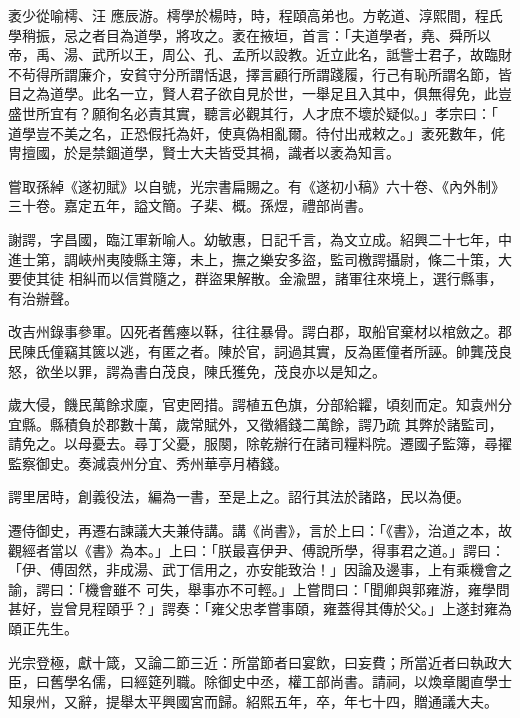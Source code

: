 \begin{pinyinscope}
 袤少從喻樗、汪
 應辰游。樗學於楊時，時，程頤高弟也。方乾道、淳熙間，程氏學稍振，忌之者目為道學，將攻之。袤在掖垣，首言：「夫道學者，堯、舜所以帝，禹、湯、武所以王，周公、孔、孟所以設教。近立此名，詆訾士君子，故臨財不茍得所謂廉介，安貧守分所謂恬退，擇言顧行所謂踐履，行己有恥所謂名節，皆目之為道學。此名一立，賢人君子欲自見於世，一舉足且入其中，俱無得免，此豈盛世所宜有？願徇名必責其實，聽言必觀其行，人才庶不壞於疑似。」孝宗曰：「
 道學豈不美之名，正恐假托為奸，使真偽相亂爾。待付出戒敕之。」袤死數年，侂冑擅國，於是禁錮道學，賢士大夫皆受其禍，識者以袤為知言。



 嘗取孫綽《遂初賦》以自號，光宗書扁賜之。有《遂初小稿》六十卷、《內外制》三十卷。嘉定五年，謚文簡。子棐、概。孫煜，禮部尚書。



 謝諤，字昌國，臨江軍新喻人。幼敏惠，日記千言，為文立成。紹興二十七年，中進士第，調峽州夷陵縣主簿，未上，撫之樂安多盜，監司檄諤攝尉，條二十策，大要使其徒
 相糾而以信賞隨之，群盜果解散。金渝盟，諸軍往來境上，選行縣事，有治辦聲。



 改吉州錄事參軍。囚死者舊瘞以鞂，往往暴骨。諤白郡，取船官棄材以棺斂之。郡民陳氏僮竊其篋以逃，有匿之者。陳於官，詞過其實，反為匿僮者所誣。帥龔茂良怒，欲坐以罪，諤為書白茂良，陳氏獲免，茂良亦以是知之。



 歲大侵，饑民萬餘求廩，官吏罔措。諤植五色旗，分部給糶，頃刻而定。知袁州分宜縣。縣積負於郡數十萬，歲常賦外，又徵緡錢二萬餘，諤乃疏
 其弊於諸監司，請免之。以母憂去。尋丁父憂，服闋，除乾辦行在諸司糧料院。遷國子監簿，尋擢監察御史。奏減袁州分宜、秀州華亭月樁錢。



 諤里居時，創義役法，編為一書，至是上之。詔行其法於諸路，民以為便。



 遷侍御史，再遷右諫議大夫兼侍講。講《尚書》，言於上曰：「《書》，治道之本，故觀經者當以《書》為本。」上曰：「朕最喜伊尹、傅說所學，得事君之道。」諤曰：「伊、傅固然，非成湯、武丁信用之，亦安能致治！」因論及邊事，上有乘機會之諭，諤曰：「機會雖不
 可失，舉事亦不可輕。」上嘗問曰：「聞卿與郭雍游，雍學問甚好，豈曾見程頤乎？」諤奏：「雍父忠孝嘗事頤，雍蓋得其傳於父。」上遂封雍為頤正先生。



 光宗登極，獻十箴，又論二節三近：所當節者曰宴飲，曰妄費；所當近者曰執政大臣，曰舊學名儒，曰經筵列職。除御史中丞，權工部尚書。請祠，以煥章閣直學士知泉州，又辭，提舉太平興國宮而歸。紹熙五年，卒，年七十四，贈通議大夫。




\end{pinyinscope}
